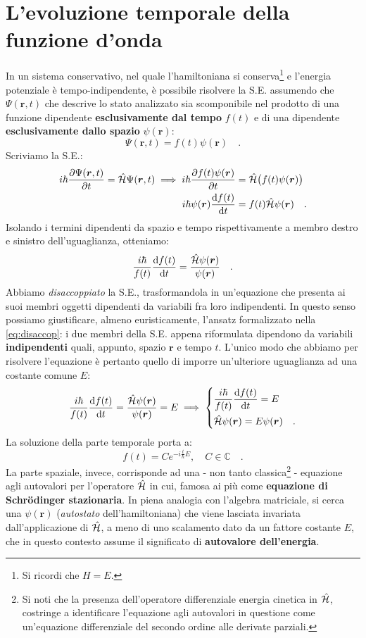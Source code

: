 \section{L'evoluzione temporale della funzione d'onda}
In un sistema conservativo, nel quale l'hamiltoniana si conserva\footnote{Si ricordi che $H = E$.} e l'energia potenziale è tempo-indipendente, è possibile risolvere la S.E. assumendo che $\Psi(\bm{r},t)$ che descrive lo stato analizzato sia scomponibile nel prodotto di una funzione dipendente \textbf{esclusivamente dal tempo} $f(t)$ e di una dipendente \textbf{esclusivamente dallo spazio} $\psi(\bm{r})$:
\begin{equation}
    \Psi(\bm{r},t) = f(t)\psi(\bm{r}) \quad.
    \label{eq:disaccop}
\end{equation}
Scriviamo la S.E.:
\[
\begin{aligned}
    i\hbar \pdv{\Psi(\bm{r},t)}{t} = \hat{\mathcal{H}}\Psi(\bm{r},t) \implies
    i\hbar \pdv{f(t)\psi(\bm{r})}{t} &= \hat{\mathcal{H}}\big(f(t)\psi(\bm{r})\big) \\
    i\hbar \psi(\bm{r})\dv{f(t)}{t} &= f(t)\hat{\mathcal{H}}\psi(\bm{r}) \quad.
\end{aligned}
\]
Isolando i termini dipendenti da spazio e tempo rispettivamente a membro destro e sinistro dell'uguaglianza, otteniamo:
\[
\frac{i\hbar}{f(t)}\dv{f(t)}{t} = \frac{\hat{\mathcal{H}}\psi(\bm{r})}{\psi{(\bm{r})}} \quad.
\] 
Abbiamo \emph{disaccoppiato} la S.E., trasformandola in un'equazione che presenta ai suoi membri oggetti dipendenti da variabili fra loro indipendenti. In questo senso possiamo giustificare, almeno euristicamente, l'ansatz formalizzato nella \eqref{eq:disaccop}: i due membri della S.E. appena riformulata dipendono da variabili \textbf{indipendenti} quali, appunto, spazio $\bm{r}$ e tempo $t$. L'unico modo che abbiamo per risolvere l'equazione è pertanto quello di imporre un'ulteriore uguaglianza ad una costante comune $E$: 
\[
\frac{i\hbar}{f(t)}\dv{f(t)}{t} = \frac{\hat{\mathcal{H}}\psi(\bm{r})}{\psi{(\bm{r})}} = E \implies 
\begin{dcases}
    \frac{i\hbar}{f(t)}\dv{f(t)}{t} = E \\
    {\hat{\mathcal{H}}\psi(\bm{r})} = E{\psi{(\bm{r})}} \quad.
\end{dcases}
\] 
La soluzione della parte temporale porta a:
\begin{equation}
    f(t) = Ce^{-i\frac{t}{\hbar}E}, \quad C \in \mathbb{C} \quad.
\end{equation}
La parte spaziale, invece, corrisponde ad una - non tanto classica\footnote{Si noti che la presenza dell'operatore differenziale energia cinetica in $\hat{\mathcal{H}}$, costringe a identificare l'equazione agli autovalori in questione come un'equazione differenziale del secondo ordine alle derivate parziali.} - equazione agli autovalori per l'operatore $\hat{\mathcal{H}}$ in cui, famosa ai più come \textbf{equazione di Schrödinger stazionaria}. In piena analogia con l'algebra matriciale, si cerca una $\psi(\bm{r})$ (\emph{autostato} dell'hamiltoniana) che viene lasciata invariata dall'applicazione di $\hat{\mathcal{H}}$, a meno di uno scalamento dato da un fattore costante $E$, che in questo contesto assume il significato di \textbf{autovalore dell'energia}. 

